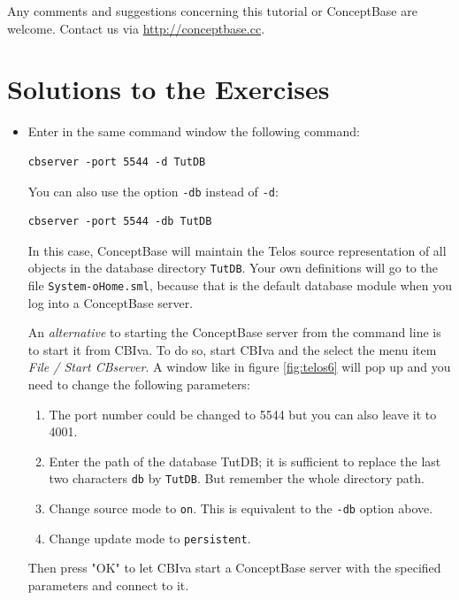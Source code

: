 \documentclass[10pt,a4paper]{article}
\begin{document}
Any comments and suggestions concerning this tutorial or ConceptBase
are welcome. Contact us via 
\url{http://conceptbase.cc}.



\newpage
\section{Solutions to the Exercises}

\begin{itemize}

\item 	[2.1]

Enter in the same command window the following command:
\begin{verbatim}
cbserver -port 5544 -d TutDB
\end{verbatim}

You can also use the option {\tt -db} instead of {\tt -d}:

\begin{verbatim}
cbserver -port 5544 -db TutDB
\end{verbatim}

In this case, ConceptBase will maintain the Telos source representation
of all objects in the database directory {\tt TutDB}. Your own definitions
will go to the file {\tt System-oHome.sml}, because that is the default
database module when you log into a ConceptBase server.

\vspace{0.2cm}
An {\em alternative} to starting the ConceptBase server from the command line is
to start it from CBIva. To do so, start CBIva and the select the menu item
{\em File / Start CBserver}. A window like in figure \ref{fig:telos6} will pop up and
you need to change the following parameters:

\begin{enumerate}
\item The port number could be changed to 5544 but you can also leave it to 4001.
\item Enter the path of the database TutDB; it is sufficient to replace the last two characters
  {\tt db} by {\tt TutDB}. But remember the whole directory path.
\item Change source mode to {\tt on}. This is equivalent to the {\tt -db} option above.
\item Change update mode to {\tt persistent}.
\end{enumerate}

Then press "OK" to let CBIva start a ConceptBase server with the specified parameters
and connect to it.



\end{itemize}
\end{document}
